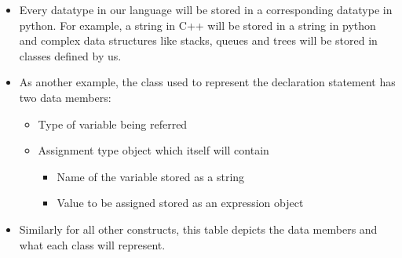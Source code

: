 \documentclass{article}
\begin{document}
\begin{itemize}
\item Every datatype in our language will be stored in a corresponding datatype in python. For example, a string in C++ will be stored in a string in python and complex data structures like stacks, queues and trees will be stored in classes defined by us.
\item As another example, the class used to represent the declaration statement has two data members:
\begin{itemize}
\item Type of variable being referred
\item Assignment type object which itself will contain 
\begin{itemize}
    \item Name of the variable stored as a string
    \item Value to be assigned stored as an expression object
\end{itemize}
\end{itemize}
\item Similarly for all other constructs, this table depicts the data members and what each class will represent.



\end{itemize}
\end{document}
